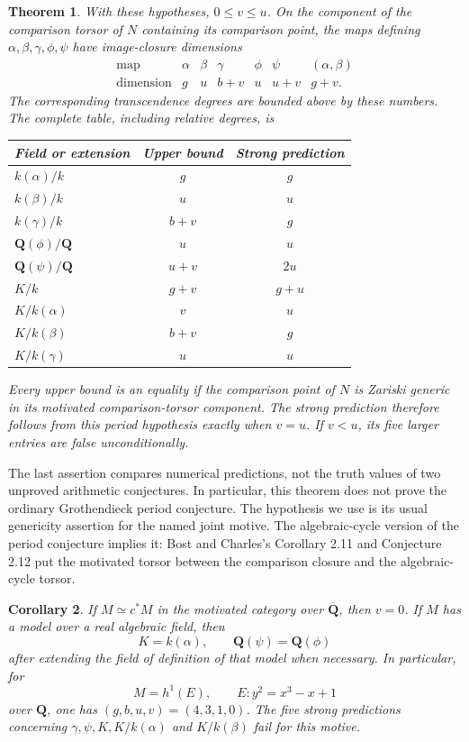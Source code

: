 \documentclass[11pt]{article}
\newtheorem{theorem}{Theorem}[section]
\newtheorem{corollary}[theorem]{Corollary}
\theoremstyle{definition}\newtheorem{definition}[theorem]{Definition}
\theoremstyle{remark}\newtheorem{remark}[theorem]{Remark}
\newcommand{\Q}{\mathbf Q}\newcommand{\Z}{\mathbf Z}
\newcommand{\Qb}{\overline{\mathbf Q}}\newcommand{\Fp}{\mathbf F_p}
\begin{document}
\begin{theorem}\label{thm:main}
With these hypotheses, $0\leq v\leq u$. On the component of the comparison torsor of $N$ containing its comparison point, the maps defining $\alpha,\beta,\gamma,\phi,\psi$ have image-closure dimensions
\[
\begin{array}{c|rrrrrr}
\text{map}&\alpha&\beta&\gamma&\phi&\psi&(\alpha,\beta)\\ \hline
\text{dimension}&g&u&b+v&u&u+v&g+v.
\end{array}
\]
The corresponding transcendence degrees are bounded above by these numbers. The complete table, including relative degrees, is
\begin{center}
\begin{tabular}{@{}lcc@{}}
\toprule
Field or extension&Upper bound&Strong prediction\\
\midrule
$k(\alpha)/k$&$g$&$g$\\
$k(\beta)/k$&$u$&$u$\\
$k(\gamma)/k$&$b+v$&$g$\\
$\Q(\phi)/\Q$&$u$&$u$\\
$\Q(\psi)/\Q$&$u+v$&$2u$\\
$K/k$&$g+v$&$g+u$\\
$K/k(\alpha)$&$v$&$u$\\
$K/k(\beta)$&$b+v$&$g$\\
$K/k(\gamma)$&$u$&$u$\\
\bottomrule
\end{tabular}
\end{center}
Every upper bound is an equality if the comparison point of $N$ is Zariski generic in its motivated comparison-torsor component. The strong prediction therefore follows from this period hypothesis exactly when $v=u$. If $v<u$, its five larger entries are false unconditionally.
\end{theorem}

The last assertion compares numerical predictions, not the truth values of two unproved arithmetic conjectures. In particular, this theorem does not prove the ordinary Grothendieck period conjecture. The hypothesis we use is its usual genericity assertion for the named joint motive. The algebraic-cycle version of the period conjecture implies it: Bost and Charles's Corollary 2.11 and Conjecture 2.12 \cite[pp.~11--12]{BostCharles} put the motivated torsor between the comparison closure and the algebraic-cycle torsor.

\begin{corollary}\label{cor:real}
If $M\simeq c^*M$ in the motivated category over $\Qb$, then $v=0$. If $M$ has a model over a real algebraic field, then
\[
                 K=k(\alpha),\qquad \Q(\psi)=\Q(\phi)
\]
after extending the field of definition of that model when necessary. In particular, for
\[
               M=h^1(E),\qquad E:y^2=x^3-x+1
\]
over $\Q$, one has $(g,b,u,v)=(4,3,1,0)$. The five strong predictions concerning $\gamma,\psi,K,K/k(\alpha)$ and $K/k(\beta)$ fail for this motive.
\end{corollary}
\end{document}
